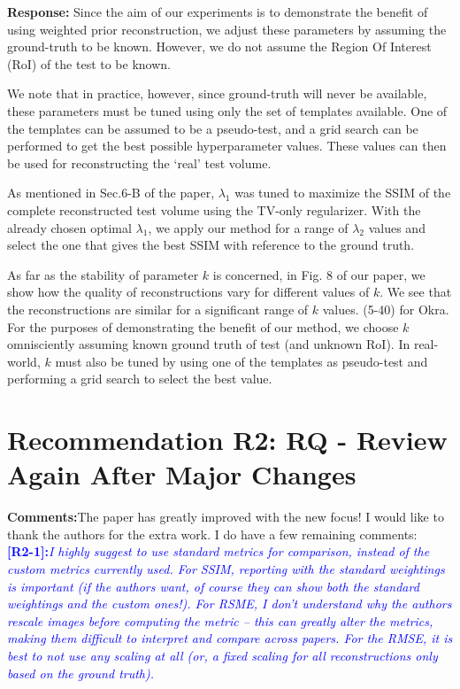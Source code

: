\documentclass{article}
\begin{document}
\textbf{Response:} Since the aim of our experiments is to demonstrate the benefit of using weighted prior reconstruction, we adjust these parameters by assuming the ground-truth to be known. However, we do not assume the Region Of Interest (RoI) of the test to be known.

We note that in practice, however, since ground-truth will never be
available, these parameters must be tuned using only the set of
templates available.  One of the templates can be assumed to be a
pseudo-test, and a grid search can be performed to get the best
possible hyperparameter values. These values can then be used for
reconstructing the `real' test volume.

As mentioned in Sec.6-B of the paper, $\lambda_1$ was tuned to maximize the SSIM of the complete reconstructed test volume using the TV-only regularizer. With the already chosen optimal $\lambda_1$, we apply our method for a range of $\lambda_2$ values and select the one that gives the best SSIM with reference to the ground truth.

As far as the stability of parameter $k$ is concerned, in Fig. 8 of our paper, we show how the quality of reconstructions vary for different values of $k$. We see that the reconstructions are similar for a significant range of $k$ values. (5-40) for Okra. For the purposes of demonstrating the benefit of our method, we choose $k$ omnisciently assuming known ground truth of test (and unknown RoI). In real-world, $k$ must also be tuned by using one of the templates as pseudo-test and performing a grid search to select the best value.\\


\section{Recommendation R2: RQ - Review Again After Major Changes}

\textbf{Comments:}The paper has greatly improved with the new focus! I would like to thank the authors for the extra work. I do have a few remaining comments:\\

\textcolor{blue}{\textbf{[R2-1]:}\textit{I highly suggest to use standard metrics for comparison, instead of the custom metrics currently used. For SSIM, reporting with the standard weightings is important (if the authors want, of course they can show both the standard weightings and the custom ones!). For RSME, I don't understand why the authors rescale images before computing the metric -- this can greatly alter the metrics, making them difficult to interpret and compare across papers. For the RMSE, it is best to not use any scaling at all (or, a fixed scaling for all reconstructions only based on the ground truth).
}}\\
\end{document}
